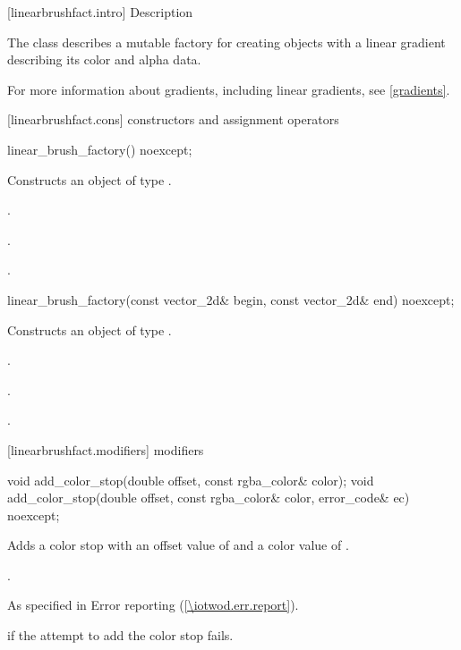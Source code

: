  [linearbrushfact.intro] { Description}

\pnum
{}
The class  describes a mutable factory for creating  objects with a linear gradient describing its color and alpha data.

\pnum
For more information about gradients, including linear gradients, see \ref{gradients}.

 [linearbrushfact.cons] { constructors and assignment operators}

\begin{itemdecl}
linear_brush_factory() noexcept;
\end{itemdecl}
\begin{itemdescr}
\pnum
\effects
Constructs an object of type .

\pnum
\postconditions
{}.

\pnum
{}.

\pnum
{}.
\end{itemdescr}

\begin{itemdecl}
linear_brush_factory(const vector_2d& begin, const vector_2d& end) noexcept;
\end{itemdecl}
\begin{itemdescr}
\pnum
\effects
Constructs an object of type .

\pnum
\postconditions
{}.

\pnum
{}.

\pnum
{}.
\end{itemdescr}

 [linearbrushfact.modifiers] { modifiers}

\begin{itemdecl}
void add_color_stop(double offset, const rgba_color& color);
void add_color_stop(double offset, const rgba_color& color, 
  error_code& ec) noexcept;
\end{itemdecl}
\begin{itemdescr}
\pnum
\effects
Adds a color stop with an offset value of  and a color value of .

\pnum
{}.

\pnum
\throws
As specified in Error reporting (\ref{\iotwod.err.report}).

\pnum
\errors
{} if the attempt to add the color stop fails.
\end{itemdescr}

